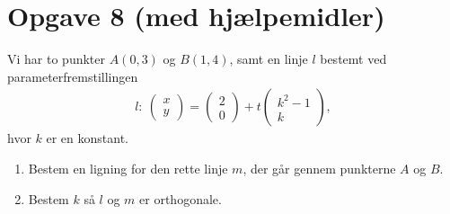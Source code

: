 \section*{Opgave 8 \large (med hjælpemidler) }
Vi har to punkter $A(0,3)$ og $B(1,4)$, samt en linje $l$ bestemt ved parameterfremstillingen
\begin{align*}
l:\ \begin{pmatrix}
x\\y
\end{pmatrix} =  \begin{pmatrix}
2\\0
\end{pmatrix}+ t \begin{pmatrix}
k^2-1\\k
\end{pmatrix},
\end{align*}
hvor $k$ er en konstant. 
\begin{enumerate}[label=\roman*)]
\item Bestem en ligning for den rette linje $m$, der går gennem punkterne $A$ og $B$.
\item Bestem $k$ så $l$ og $m$ er orthogonale.
\end{enumerate}